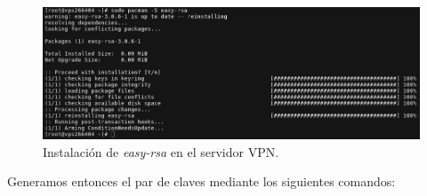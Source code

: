 \documentclass[a4paper, 11pt, titlepage]{article}
\begin{document}
            \begin{figure}[htp]
                \centering
                \includegraphics[width=1\textwidth]{resources/ca08.png}
                \caption{Instalación de \textit{easy-rsa} en el servidor VPN.}
                \label{ca08}
            \end{figure}
        
            Generamos entonces el par de claves mediante los siguientes comandos:
        
\end{document}
